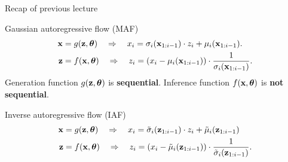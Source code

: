 

\begin{frame}
\titlepage
\end{frame}
\begin{frame}{Recap of previous lecture}
	\begin{block}{Gaussian autoregressive flow (MAF)}
		\vspace{-0.8cm}
		\begin{align*}
			\mathbf{x} &= g(\mathbf{z}, \boldsymbol{\theta}) \quad \Rightarrow \quad x_i = \sigma_i (\mathbf{x}_{1:i-1}) \cdot z_i + \mu_i(\mathbf{x}_{1:i-1}). \\
			\mathbf{z} &= f(\mathbf{x}, \boldsymbol{\theta}) \quad \Rightarrow \quad z_i = \left(x_i - \mu_i(\mathbf{x}_{1:i-1}) \right) \cdot \frac{1}{ \sigma_i (\mathbf{x}_{1:i-1})}.
		\end{align*}
		Generation function $g(\mathbf{z}, \boldsymbol{\theta})$ is \textbf{sequential}. Inference function $f(\mathbf{x}, \boldsymbol{\theta})$ is \textbf{not sequential}.
	\end{block}
	\begin{block}{Inverse autoregressive flow (IAF)}
		\vspace{-0.5cm}
		\begin{align*}
			\mathbf{x} &= g(\mathbf{z}, \boldsymbol{\theta}) \quad \Rightarrow \quad x_i = \tilde{\sigma}_i (\mathbf{z}_{1:i-1}) \cdot z_i + \tilde{\mu}_i(\mathbf{z}_{1:i-1}) \\
			\mathbf{z} &= f(\mathbf{x}, \boldsymbol{\theta}) \quad \Rightarrow \quad z_i = \left( x_i - \tilde{\mu}_i(\mathbf{z}_{1:i-1})\right) \cdot \frac{1}{\tilde{\sigma}_i (\mathbf{z}_{1:i-1}) }.
		\end{align*}
		\vspace{-0.3cm}
	\end{block}
		
\end{frame}
